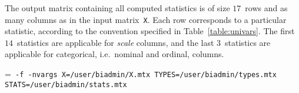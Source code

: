 \smallskip
{}
\smallskip

The output matrix containing all computed statistics is of size $17$~rows and
as many columns as in the input matrix~\texttt{X}.  Each row corresponds to
a particular statistic, according to the convention specified in
Table~\ref{table:univars}.  The first $14$~statistics are applicable for
\emph{scale} columns, and the last $3$~statistics are applicable for categorical,
i.e.\ nominal and ordinal, columns.


\pagebreak[2]

\smallskip
{}
\smallskip

{\hangindent=\parindent\noindent\tt
\hml -f \UnivarScriptName{} -nvargs X=/user/biadmin/X.mtx
  TYPES=/user/biadmin/types.mtx
  STATS=/user/biadmin/stats.mtx

}

